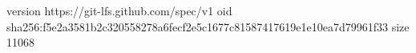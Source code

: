 version https://git-lfs.github.com/spec/v1
oid sha256:f5e2a3581b2c320558278a6fecf2e5c1677c81587417619e1e10ea7d79961f33
size 11068
